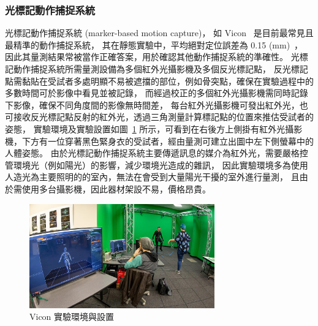 \subsubsection{光標記動作捕捉系統}
光標記動作捕捉系統 (marker-based motion capture)，
如 Vicon ~\cite{vicon_web}是目前最常見且最精準的動作捕捉系統，
其在靜態實驗中，平均絕對定位誤差為 0.15 (mm)~\cite{merriaux2017study}，
因此其量測結果常被當作正確答案，用於確認其他動作捕捉系統的準確性。
光標記動作捕捉系統所需量測設備為多個紅外光攝影機及多個反光標記點，
反光標記點需黏貼在受試者多處明顯不易被遮擋的部位，例如骨突點，確保在實驗過程中的多數時間可於影像中看見並被記錄，
而經過校正的多個紅外光攝影機需同時記錄下影像，確保不同角度間的影像無時間差，
每台紅外光攝影機可發出紅外光，也可接收反光標記點反射的紅外光，透過三角測量計算標記點的位置來推估受試者的姿態，
實驗環境及實驗設置如圖~\ref{ch2_fig_OMC_Vicon} 所示，可看到在右後方上側掛有紅外光攝影機，下方有一位穿著黑色緊身衣的受試者，經由量測可建立出圖中左下側螢幕中的人體姿態。
由於光標記動作捕捉系統主要傳遞訊息的媒介為紅外光，需要嚴格控管環境光（例如陽光）的影響，減少環境光造成的雜訊，
因此實驗環境多為使用人造光為主要照明的的室內，無法在會受到大量陽光干擾的室外進行量測，
且由於需使用多台攝影機，因此器材架設不易，價格昂貴。

\begin{figure}[!ht]
    \centering
    \includegraphics[width=8cm]{figure/ch2_fig_OMC_Vicon.jpg}
     \caption[Vicon 實驗環境與設置~\cite{vicon_web}]{Vicon 實驗環境與設置~\cite{vicon_web}}
     \label{ch2_fig_OMC_Vicon}
\end{figure}

